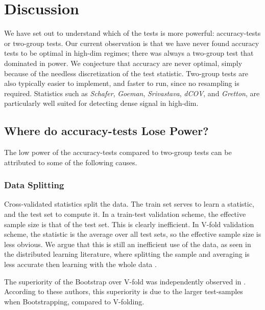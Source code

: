 \documentclass[]{bio}
\begin{document}
\section{Discussion}
\label{sec:discussion}

We have set out to understand which of the tests is more powerful: accuracy-tests or two-group tests. 
Our current observation is that we have never found accuracy tests to be optimal in high-dim regimes; there was always a two-group test that dominated in power.
We conjecture that accuracy are never optimal, simply because of the needless discretization of the test statistic. 
Two-group tests are also typically easier to implement, and faster to run, since no resampling is required. 
Statistics such as \emph{Schafer}, \emph{Goeman}, \emph{Srivastava}, \emph{dCOV}, and \emph{Gretton}, are particularly well suited for detecting dense signal in high-dim.



\subsection{Where do accuracy-tests Lose Power?}
The low power of the accuracy-tests compared to two-group tests can be attributed to some of the following causes.

\subsubsection{Data Splitting}
Cross-validated statistics split the data.
The train set serves to learn a statistic, and the test set to compute it.
In a train-test validation scheme, the effective sample size is that of the test set.
This is clearly inefficient. 
In V-fold validation scheme, the statistic is the average over all test sets, so the effective sample size is less obvious. 
We argue that this is still an inefficient use of the data, as seen in the distributed learning literature, where splitting the sample and averaging is less accurate then learning with the whole data \citep{rosenblatt2016optimality}.

The superiority of the Bootstrap over V-fold was independently observed in \cite{yu2007two}. 
According to these authors, this superiority is due to the larger test-samples when Bootstrapping, compared to V-folding.
\end{document}
